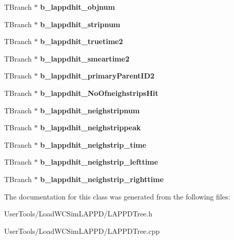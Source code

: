 \begin{DoxyCompactItemize}
\item 
\hypertarget{classLAPPDTree_a8f6eea3420011bb1a15307d4ab38c8fd}{T\-Branch $\ast$ {\bfseries b\-\_\-lappdhit\-\_\-objnum}}\label{classLAPPDTree_a8f6eea3420011bb1a15307d4ab38c8fd}

\item 
\hypertarget{classLAPPDTree_a719cbac920cf65ff67af978dfbac12d2}{T\-Branch $\ast$ {\bfseries b\-\_\-lappdhit\-\_\-stripnum}}\label{classLAPPDTree_a719cbac920cf65ff67af978dfbac12d2}

\item 
\hypertarget{classLAPPDTree_a3ba0a48b444731d20574179863c896a6}{T\-Branch $\ast$ {\bfseries b\-\_\-lappdhit\-\_\-truetime2}}\label{classLAPPDTree_a3ba0a48b444731d20574179863c896a6}

\item 
\hypertarget{classLAPPDTree_a18aee356c45455494e3168712bc31f81}{T\-Branch $\ast$ {\bfseries b\-\_\-lappdhit\-\_\-smeartime2}}\label{classLAPPDTree_a18aee356c45455494e3168712bc31f81}

\item 
\hypertarget{classLAPPDTree_a41a93215c8835469b83d7ba9b5910783}{T\-Branch $\ast$ {\bfseries b\-\_\-lappdhit\-\_\-primary\-Parent\-I\-D2}}\label{classLAPPDTree_a41a93215c8835469b83d7ba9b5910783}

\item 
\hypertarget{classLAPPDTree_a325d2982f6d588f05a852ca75aa850f8}{T\-Branch $\ast$ {\bfseries b\-\_\-lappdhit\-\_\-\-No\-Ofneighstrips\-Hit}}\label{classLAPPDTree_a325d2982f6d588f05a852ca75aa850f8}

\item 
\hypertarget{classLAPPDTree_a54214ff49a3743466717febd048e0d20}{T\-Branch $\ast$ {\bfseries b\-\_\-lappdhit\-\_\-neighstripnum}}\label{classLAPPDTree_a54214ff49a3743466717febd048e0d20}

\item 
\hypertarget{classLAPPDTree_aa7b113f55684fabe737895d860c8ec7e}{T\-Branch $\ast$ {\bfseries b\-\_\-lappdhit\-\_\-neighstrippeak}}\label{classLAPPDTree_aa7b113f55684fabe737895d860c8ec7e}

\item 
\hypertarget{classLAPPDTree_ab8c7888fd048b0d5b6d8c15634ee7919}{T\-Branch $\ast$ {\bfseries b\-\_\-lappdhit\-\_\-neighstrip\-\_\-time}}\label{classLAPPDTree_ab8c7888fd048b0d5b6d8c15634ee7919}

\item 
\hypertarget{classLAPPDTree_adbf2e61a53af0c4f535b64b90e942f27}{T\-Branch $\ast$ {\bfseries b\-\_\-lappdhit\-\_\-neighstrip\-\_\-lefttime}}\label{classLAPPDTree_adbf2e61a53af0c4f535b64b90e942f27}

\item 
\hypertarget{classLAPPDTree_ae3992ee3c8fb6400ae25486d15bba708}{T\-Branch $\ast$ {\bfseries b\-\_\-lappdhit\-\_\-neighstrip\-\_\-righttime}}\label{classLAPPDTree_ae3992ee3c8fb6400ae25486d15bba708}

\end{DoxyCompactItemize}


The documentation for this class was generated from the following files\-:\begin{DoxyCompactItemize}
\item 
User\-Tools/\-Load\-W\-C\-Sim\-L\-A\-P\-P\-D/L\-A\-P\-P\-D\-Tree.\-h\item 
User\-Tools/\-Load\-W\-C\-Sim\-L\-A\-P\-P\-D/L\-A\-P\-P\-D\-Tree.\-cpp\end{DoxyCompactItemize}
